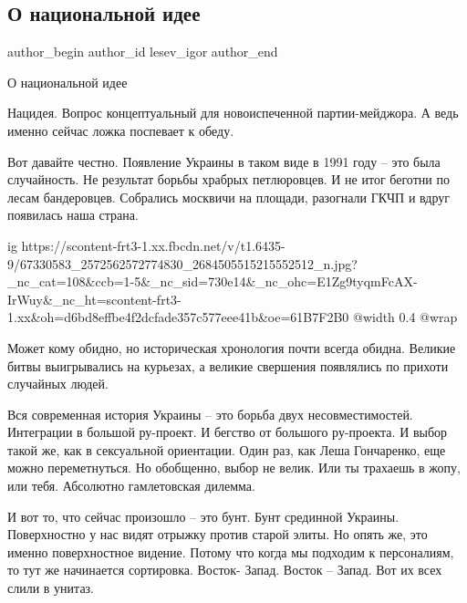  
 
 
 
 
 
\subsection{О национальной идее}
\label{sec:24_07_2019.fb.lesev_igor.1.nacidea}
 
\ifcmt
 author_begin
   author_id lesev_igor
 author_end
\fi

О национальной идее

Нацидея. Вопрос концептуальный для новоиспеченной партии-мейджора. А ведь
именно сейчас ложка поспевает к обеду.

Вот давайте честно. Появление Украины в таком виде в 1991 году – это была
случайность. Не результат борьбы храбрых петлюровцев. И не итог беготни по
лесам бандеровцев. Собрались москвичи на площади, разогнали ГКЧП и вдруг
появилась наша страна.

\ifcmt
  ig https://scontent-frt3-1.xx.fbcdn.net/v/t1.6435-9/67330583_2572562572774830_2684505515215552512_n.jpg?_nc_cat=108&ccb=1-5&_nc_sid=730e14&_nc_ohc=E1Zg9tyqmFcAX-IrWuy&_nc_ht=scontent-frt3-1.xx&oh=d6bd8effbe4f2dcfade357c577eee41b&oe=61B7F2B0
  @width 0.4
  @wrap 
\fi

Может кому обидно, но историческая хронология почти всегда обидна. Великие
битвы выигрывались на курьезах, а великие свершения появлялись по прихоти
случайных людей.

Вся современная история Украины – это борьба двух несовместимостей. Интеграции
в большой ру-проект. И бегство от большого ру-проекта. И выбор такой же, как в
сексуальной ориентации. Один раз, как Леша Гончаренко, еще можно переметнуться.
Но обобщенно, выбор не велик. Или ты трахаешь в жопу, или тебя. Абсолютно
гамлетовская дилемма.

И вот то, что сейчас произошло – это бунт. Бунт срединной Украины. Поверхностно
у нас видят отрыжку против старой элиты. Но опять же, это именно поверхностное
видение. Потому что когда мы подходим к персоналиям, то тут же начинается
сортировка. Восток- Запад. Восток – Запад. Вот их всех слили в унитаз.

